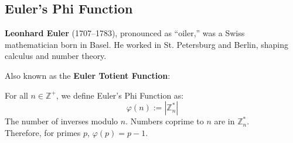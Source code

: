 \subsection{Euler's Phi Function}
\begin{Tip}
    \textbf{Leonhard Euler} (1707–1783), pronounced as ``oiler,'' was a Swiss mathematician born in Basel. He worked in St. Petersburg and Berlin, shaping calculus and number theory.
\end{Tip}

\noindent
Also known as the \textbf{Euler Totient Function}:
\begin{Def}

    \label{def:euler_phi}

    For all $n\in\mathbb{Z^+}$, we define Euler's Phi Function as:
    \[\varphi (n):=|\mathbb{Z}_n^*|\]
    \noindent
    The number of inverses modulo $n$. Numbers coprime to $n$ are in $\mathbb{Z}_n^*$.\\
     Therefore, for primes $p$, $\varphi(p)=p-1$.
\end{Def}

